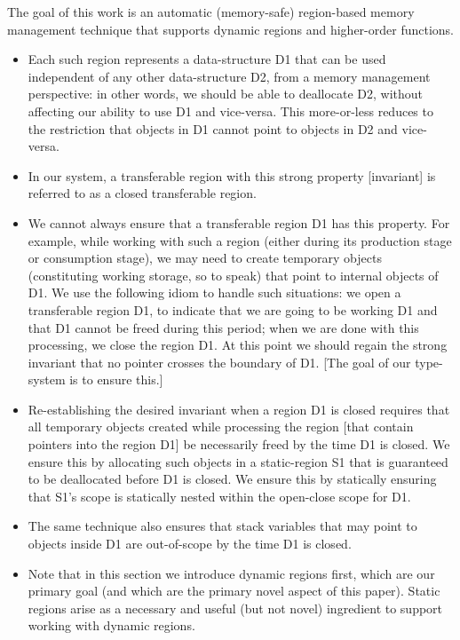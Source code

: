 The goal of this work is an automatic (memory-safe) region-based memory management technique
that supports dynamic regions and higher-order functions.

\begin{itemize}


\item
Each such region represents a data-structure D1 that can be used independent of any other data-structure D2, from a memory management perspective: in other words, we should be able to deallocate D2, without affecting our ability to use D1 and vice-versa. This more-or-less reduces to the restriction that objects in D1 cannot point to objects in D2 and vice-versa.
\item
In our system, a transferable region with this strong property [invariant] is referred to as a closed transferable region.  

\item
We cannot always ensure that a transferable region D1 has this property. For example, while working with such a region (either during its production stage or consumption stage), we may need to create temporary objects (constituting working storage, so to speak) that point to internal objects of D1. We use the following idiom to handle such situations: we open a transferable region D1, to indicate that we are going to be working D1 and that D1 cannot be freed during this period; when we are done with this processing, we close the region D1. At this point we should regain the strong invariant that no pointer crosses the boundary of D1. [The goal of our type-system is to ensure this.]

\item
Re-establishing the desired invariant when a region D1 is closed requires that all temporary objects created while processing the region [that contain pointers into the region D1] be necessarily freed by the time D1 is closed. We ensure this by allocating such objects in a static-region S1 that is guaranteed to be deallocated before D1 is closed. We ensure this by statically ensuring that S1's scope is statically nested within the open-close scope for D1.

\item
The same technique also ensures that stack variables that may point to objects inside D1 are out-of-scope by the time D1 is closed.

\item
Note that in this section we introduce dynamic regions first, which are our primary goal (and which are the primary novel aspect of this paper). Static regions arise as a necessary and useful (but not novel) ingredient to support working with dynamic regions.


\end{itemize}

